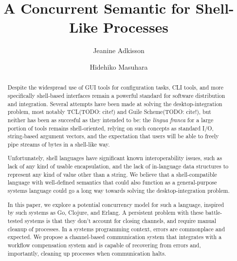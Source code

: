 \documentclass[format=sigconf, review=true, screen=true]{acmart}
\title{A Concurrent Semantic for Shell-Like Processes}
\author{Jeanine Adkisson}
\affiliation{Tokyo Institute of Technology}
\author{Hidehiko Masuhara}
\affiliation{Tokyo Institute of Technology}
\begin{document}
\begin{abstract}
Despite the widespread use of GUI tools for configuration tasks, CLI tools, and more specifically shell-based interfaces remain a powerful standard for software distribution and integration. Several attempts have been made at solving the desktop-integration problem, most notably TCL(TODO: cite!) and Guile Scheme(TODO: cite!), but neither has been as succesful as they intended to be: the \emph{lingua franca} for a large portion of tools remains shell-oriented, relying on such concepts as standard I/O, string-based argument vectors, and the expectation that users will be able to freely pipe streams of bytes in a shell-like way.

Unfortunately, shell languages have significant known interoperability issues, such as lack of any kind of usable encapsulation, and the lack of in-language data structures to represent any kind of value other than a string. We believe that a shell-compatible language with well-defined semantics that could also function as a general-purpose systems language could go a long way towards solving the desktop-integration problem.

In this paper, we explore a potential concurrency model for such a language, inspired by such systems as Go, Clojure, and Erlang. A persistent problem with these battle-tested systems is that they don't account for closing channels, and require manual cleanup of processes. In a systems programming context, errors are commonplace and expected. We propose a channel-based communication system that integrates with a workflow compensation system and is capable of recovering from errors and, importantly, cleaning up processes when communication halts.
\end{abstract}
\maketitle
\end{document}
